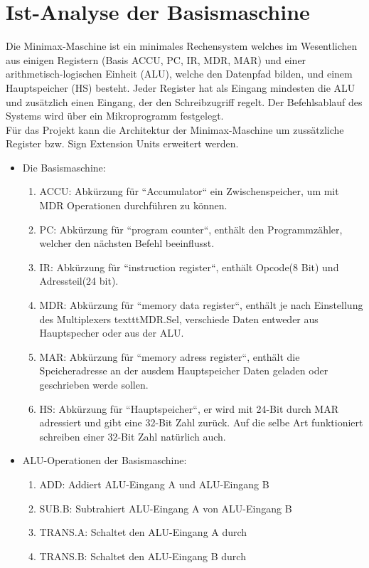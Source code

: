 \documentclass[12pt,titlepage,german,a4]{article}
\begin{document}
    \newpage

    \section{Ist-Analyse der Basismaschine}
    Die Minimax-Maschine ist ein minimales Rechensystem welches im Wesentlichen aus einigen Registern (Basis ACCU, PC, IR, MDR, MAR) und einer arithmetisch-logischen Einheit (ALU), welche den Datenpfad bilden, und einem Hauptspeicher (HS) besteht. Jeder Register hat als Eingang mindesten die ALU und zus{\"a}tzlich einen Eingang, der den Schreibzugriff regelt. Der Befehlsablauf des Systems wird {\"u}ber ein Mikroprogramm festgelegt.\\
    F{\"u}r das Projekt kann die Architektur der Minimax-Maschine um zuss{\"a}tzliche Register bzw. Sign Extension Units erweitert werden. \\
    \begin{itemize}
        \item Die Basismaschine:
        \begin{enumerate}
            \item ACCU: Abk{\"u}rzung f{\"u}r “Accumulator“ ein Zwischenspeicher, um mit MDR Operationen durchf{\"u}hren zu k{\"o}nnen.
            \item PC: Abk{\"u}rzung f{\"u}r “program counter“, enth{\"a}lt den Programmz{\"a}hler, welcher den n{\"a}chsten Befehl beeinflusst.
            \item IR: Abk{\"u}rzung f{\"u}r “instruction register“, enth{\"a}lt Opcode(8 Bit) und Adressteil(24 bit).
            \item MDR: Abk{\"u}rzung f{\"u}r “memory data register“, enth{\"a}lt je nach Einstellung des Multiplexers textttMDR.Sel, verschiede Daten entweder aus Hauptspecher oder aus der ALU.
            \item MAR: Abk{\"u}rzung f{\"u}r “memory adress register“, enth{\"a}lt die Speicheradresse an der ausdem Hauptspeicher Daten geladen oder geschrieben werde sollen.
            \item HS: Abk{\"u}rzung f{\"u}r “Hauptspeicher“, er wird mit 24-Bit durch MAR adressiert und gibt eine 32-Bit Zahl zur{\"u}ck. Auf die selbe Art funktioniert schreiben einer 32-Bit Zahl nat{\"u}rlich auch.
        \end{enumerate}
        \item ALU-Operationen der Basismaschine:
        \begin{enumerate}
            \item ADD: Addiert ALU-Eingang A und ALU-Eingang B
            \item SUB.B: Subtrahiert ALU-Eingang A von ALU-Eingang B
            \item TRANS.A: Schaltet den ALU-Eingang A durch
            \item TRANS.B: Schaltet den ALU-Eingang B durch
        \end{enumerate}
    \end{itemize}
\end{document}
